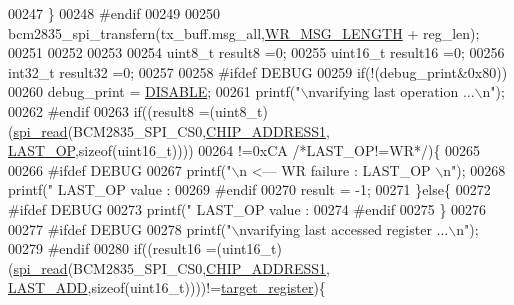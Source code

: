 \begin{DoxyCode}
{{{00247        \}
00248 \textcolor{preprocessor}{    #endif}
00249 \textcolor{preprocessor}{}
00250     bcm2835\_spi\_transfern(tx\_buff.msg\_all,\hyperlink{a00041_ac85ecf34a5cbd85d6dbd51b4c9a5469e}{WR\_MSG\_LENGTH} + reg\_len);
00251     
00252 
00253     
00254     uint8\_t  result8  =0;
00255     uint16\_t result16 =0;
00256     int32\_t result32 =0;    
00257     
00258 \textcolor{preprocessor}{     #ifdef DEBUG }
00259 \textcolor{preprocessor}{}     \textcolor{keywordflow}{if}(!(debug\_print&0x80))
00260      debug\_print = \hyperlink{a00037_a99496f7308834e8b220f7894efa0b6ab}{DISABLE};
00261        printf(\textcolor{stringliteral}{"\(\backslash\)nvarifying last operation  ...\(\backslash\)n"});
00262 \textcolor{preprocessor}{     #endif}
00263 \textcolor{preprocessor}{}     \textcolor{keywordflow}{if}((result8 =(uint8\_t)(\hyperlink{a00007_ga7ad9f65ee46aca507374096506a0b1c4}{spi\_read}(BCM2835\_SPI\_CS0,\hyperlink{a00037_a94de2b046db6e10257ef4481c0a15eaa}{CHIP\_ADDRESS1},
      \hyperlink{a00036_aed1301248abf6c26045727a190f6550a}{LAST\_OP},\textcolor{keyword}{sizeof}(uint16\_t))))
00264      !=0xCA \textcolor{comment}{/*LAST\_OP!=WR*/})\{
00265              
00266 \textcolor{preprocessor}{     #ifdef DEBUG}
00267 \textcolor{preprocessor}{}       printf(\textcolor{stringliteral}{"\(\backslash\)n                                               <---  WR failure : LAST\_OP \(\backslash\)n"});
00268        printf(\textcolor{stringliteral}{"        LAST\_OP value  :%
00269 \textcolor{preprocessor}{     #endif}
00270 \textcolor{preprocessor}{}     result = -1;
00271      \}\textcolor{keywordflow}{else}\{
00272 \textcolor{preprocessor}{      #ifdef DEBUG}
00273 \textcolor{preprocessor}{}       printf(\textcolor{stringliteral}{"        LAST\_OP value  :%
00274 \textcolor{preprocessor}{     #endif}
00275 \textcolor{preprocessor}{}     \}
00276      
00277 \textcolor{preprocessor}{     #ifdef DEBUG}
00278 \textcolor{preprocessor}{}       printf(\textcolor{stringliteral}{"\(\backslash\)nvarifying last accessed register  ...\(\backslash\)n"});
00279 \textcolor{preprocessor}{     #endif}
00280 \textcolor{preprocessor}{}     \textcolor{keywordflow}{if}((result16 =(uint16\_t)(\hyperlink{a00007_ga7ad9f65ee46aca507374096506a0b1c4}{spi\_read}(BCM2835\_SPI\_CS0,\hyperlink{a00037_a94de2b046db6e10257ef4481c0a15eaa}{CHIP\_ADDRESS1},
      \hyperlink{a00036_adab6c053c389db762442c88b7e32e543}{LAST\_ADD},\textcolor{keyword}{sizeof}(uint16\_t))))!=\hyperlink{a00041_ac02048009fa6718e40f028b6bae63f3d}{target\_register})\{
}}}}}
\end{DoxyCode}
